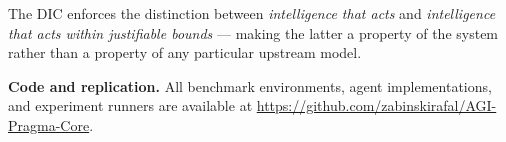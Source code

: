 \documentclass[11pt,letterpaper]{article}
\begin{document}
The DIC enforces the distinction between \textit{intelligence that acts} and
\textit{intelligence that acts within justifiable bounds} --- making the latter a
property of the system rather than a property of any particular upstream model.

\bigskip
\noindent\textbf{Code and replication.}
All benchmark environments, agent implementations, and experiment runners are
available at \url{https://github.com/zabinskirafal/AGI-Pragma-Core}.

\end{document}
